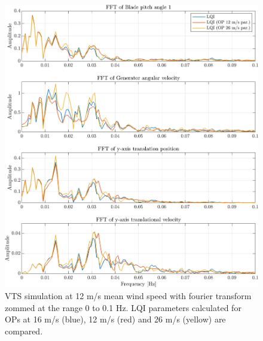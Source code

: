 \begin{figure}[ht]
	\centering
	\includegraphics[width=0.7\linewidth]{Graphics/TestResults/VTSplotting/21_fft_th_w_py_vy.png}
	\caption{VTS simulation at 12 m/s mean wind speed with fourier transform zommed at the range 0 to 0.1 Hz. LQI parameters calculated for OPs at 16 m/s (blue), 12 m/s (red) and 26 m/s (yellow) are compared.}
	\label{fig:vts_21_fft_th_w_py_vy}
\end{figure}

